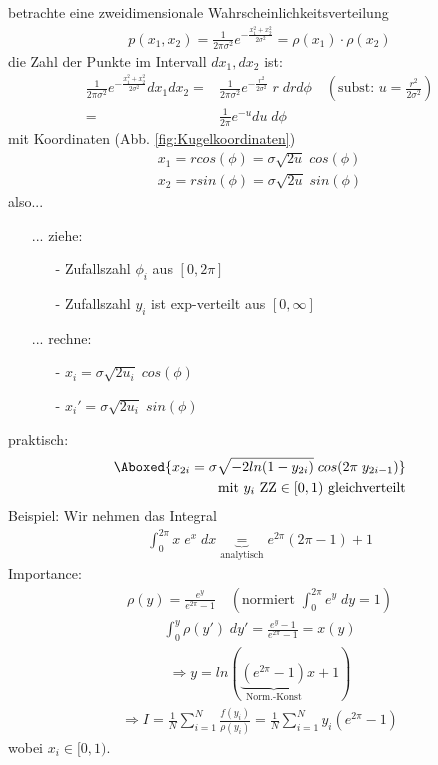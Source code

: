 \documentclass[12pt]{article}
\begin{document}
\begin{itemize}
betrachte eine zweidimensionale Wahrscheinlichkeitsverteilung
\begin{align}
p(x_1,x_2)=\frac{1}{	2 \pi \sigma^2} e^{- \frac{x_1^2 + x_2^2}{2 \sigma^2}} = \rho(x_1) \cdot \rho(x_2)
\end{align}
die Zahl der Punkte im Intervall $dx_1, dx_2$ ist:
\begin{align}
\frac{1}{	2 \pi \sigma^2} e^{- \frac{x_1^2 + x_2^2}{2 \sigma^2}} dx_1 dx_2= & \frac{1}{	2 \pi \sigma^2} e^{- \frac{r^2}{2 \sigma^2}} \;r \; dr  d\phi \quad \left( \mbox{subst: } u = \frac{r^2}{2 \sigma^2} \right) \\
= & \frac{1}{2 \pi} e^{-u} du \; d\phi
\end{align}
mit Koordinaten (Abb. \ref{fig:Kugelkoordinaten})
\begin{align*}
x_1=  r cos(\phi) = \sigma \sqrt{2 u} \; cos(\phi) \\
x_2=  r sin(\phi)= \sigma \sqrt{2 u} \; sin(\phi)
\end{align*}
also...
\begin{itemize}
\item[...] ziehe: 
\begin{itemize}
\item[-] Zufallszahl $\phi_i$ aus $[0,2\pi]$
\item[-] Zufallszahl $y_i$ ist exp-verteilt aus $[0, \infty]$
\end{itemize}
\item[...]rechne:
\begin{itemize}
\item[-] $x_i = \sigma \sqrt{2 u_i} \; cos(\phi)$
\item[-] $x_i' = \sigma \sqrt{2 u_i} \; sin(\phi)$
\end{itemize}
\end{itemize}



praktisch: \begin{align}
\Aboxed{x_{2i}= \sigma \sqrt{-2 ln(1-y_{2i})} \; cos(2\pi \; y_{2i-1}) } \\
\mbox{ mit } y_i\mbox{ ZZ} \in [0, 1) \mbox{ gleichverteilt} \nonumber
\end{align}
Beispiel: Wir nehmen das Integral
\begin{align*}
\int_0^{2\pi} x \; e^x \; dx \underbrace{=}_\text{analytisch} e^{2\pi} (2\pi -1) +1
\end{align*} 
Importance: \begin{align*}
\rho(y)= \frac{e^y}{e^{2\pi} -1}\quad  \left( \mbox{normiert } \int_0^{2\pi} e^y \; dy =1 \right) 
\end{align*}
\begin{align*}
\int_0^y \rho(y') \; dy' = \frac{e^y - 1}{e^{2\pi} - 1} = x(y)
\end{align*}
\begin{align*}
 \Rightarrow y= ln(\underbrace{(e^{2\pi}-1)}_\text{Norm.-Konst} x+1) 
 \end{align*}
 \begin{align*}
\Rightarrow  I = \frac{1}{N} \sum_{i=1}^N \frac{f(y_i)}{\rho(y_i)}= \frac{1}{N} \sum_{i=1}^N y_i (e^{2\pi}-1)
\end{align*}
wobei $x_i \in [0,1)$.
\end{itemize}
\end{document}
